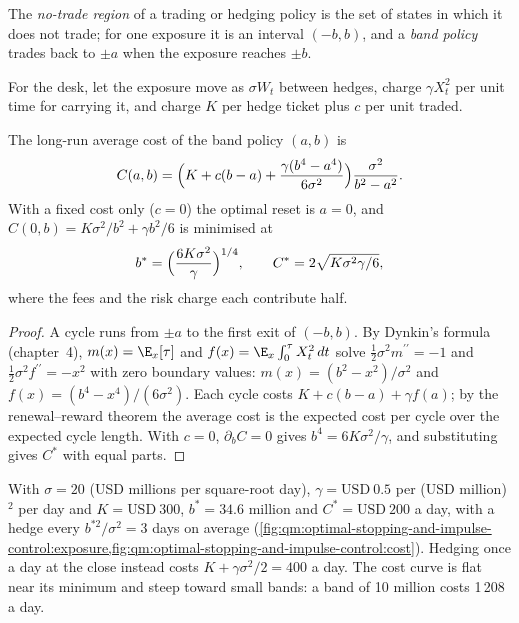 \begin{definition}\label{def:qm:optimal-stopping-and-impulse-control:notrade}
The \emph{no-trade region} of a trading or hedging policy is the set of states in which it does not
trade; for one exposure it is an interval $(-b, b)$, and a \emph{band policy} trades back to $\pm a$ when the exposure reaches
$\pm b$.
\end{definition}

For the desk, let the exposure move as $\sigma W_t$ between hedges, charge $\gamma X_t^2$ per unit time for carrying it, and
charge $K$ per hedge ticket plus $c$ per unit traded.

\begin{proposition}\label{prop:qm:optimal-stopping-and-impulse-control:band}
The long-run average cost of the band policy $(a, b)$ is
\[
C(a, b) = \Bigl(K + c(b - a) + \frac{\gamma(b^4 - a^4)}{6\sigma^2}\Bigr)\frac{\sigma^2}{b^2 - a^2}.
\]
With a fixed cost only ($c = 0$) the optimal reset is $a = 0$, and $C(0, b) = K\sigma^2/b^2 + \gamma b^2/6$ is minimised at
\[
b^* = \Bigl(\frac{6K\sigma^2}{\gamma}\Bigr)^{1/4}, \qquad C^* = 2\sqrt{K\sigma^2\gamma/6},
\]
where the fees and the risk charge each contribute half.
\end{proposition}

\begin{proof}
A cycle runs from $\pm a$ to the first exit of $(-b, b)$. By Dynkin's formula (chapter~4), $m(x) = \E_x[\tau]$ and $f(x) =
\E_x\int_0^\tau X_t^2\,dt$ solve $\tfrac12\sigma^2m^{\prime\prime} = -1$ and $\tfrac12\sigma^2f^{\prime\prime} = -x^2$ with zero boundary values: $m(x) = (b^2 -
x^2)/\sigma^2$ and $f(x) = (b^4 - x^4)/(6\sigma^2)$. Each cycle costs $K + c(b - a) + \gamma f(a)$; by the renewal--reward theorem the
average cost is the expected cost per cycle over the expected cycle length. With $c = 0$, $\partial_bC = 0$ gives $b^4 =
6K\sigma^2/\gamma$, and substituting gives $C^*$ with equal parts.
\end{proof}

With $\sigma = 20$ (USD millions per square-root day), $\gamma = \text{USD}~0.5$ per (USD million)$^2$ per day and $K = \text{USD}~300$,
$b^* = 34.6$ million and $C^* = \text{USD}~200$ a day, with a hedge every $b^{*2}/\sigma^2 = 3$ days on average
(\cref{fig:qm:optimal-stopping-and-impulse-control:exposure,fig:qm:optimal-stopping-and-impulse-control:cost}).
Hedging once a day at the close instead costs $K + \gamma\sigma^2/2 = 400$ a day. The cost curve is flat near its minimum and
steep toward small bands: a band of 10 million costs 1\,208 a day.

